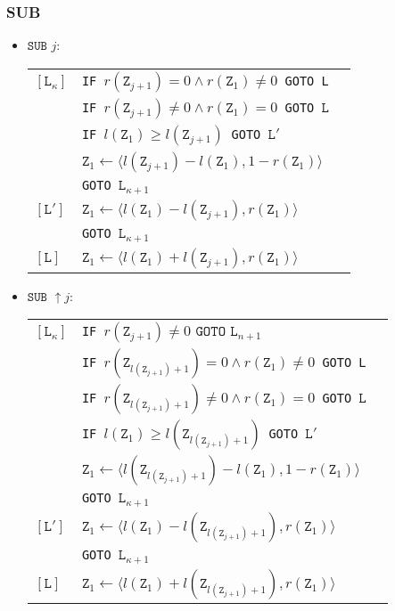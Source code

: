 \documentclass[twoside]{article}
\begin{document}
\subsubsection{SUB}
\begin{itemize}
\item $\texttt{SUB }j$:

\begin{tabular}{l l l}
$[\texttt{L}_\kappa]$&\texttt{IF }$r(\texttt{Z}_{j+1})= 0\land r(\texttt{Z}_{1})\neq 0$\texttt{ GOTO L}&\\
&\texttt{IF }$r(\texttt{Z}_{j+1})\neq 0\land r(\texttt{Z}_1)= 0$\texttt{ GOTO }$\texttt{L}$&\\
&\texttt{IF }$l(\texttt{Z}_1)\geq l(\texttt{Z}_{j+1})$\texttt{ GOTO }$\texttt{L}'$&\\
& $\texttt{Z}_1\leftarrow \langle l(\texttt{Z}_{j+1})-l(\texttt{Z}_1),1-r(\texttt{Z}_{1})\rangle$&\\
& \texttt{GOTO }$\texttt{L}_{\kappa+1}$&\\
$[\texttt{L}']$& $\texttt{Z}_1\leftarrow \langle l(\texttt{Z}_1)-l(\texttt{Z}_{j+1}),r(\texttt{Z}_{1})\rangle$&\\
& \texttt{GOTO }$\texttt{L}_{\kappa+1}$& \\
$[\texttt{L}]$& $\texttt{Z}_1\leftarrow \langle l(\texttt{Z}_{1})+l(\texttt{Z}_{j+1}),r(\texttt{Z}_{1})\rangle$&\\

\end{tabular}

\item $\texttt{SUB }\uparrow j$:

\begin{tabular}{l l l}
$[\texttt{L}_\kappa]$&\texttt{IF }$r(\texttt{Z}_{j+1})\neq 0\texttt{ GOTO }\texttt{L}_{n+1}$&\\

&\texttt{IF }$r(\texttt{Z}_{l(\texttt{Z}_{j+1})+1})= 0\land r(\texttt{Z}_{1})\neq 0$\texttt{ GOTO L}&\\
&\texttt{IF }$r(\texttt{Z}_{l(\texttt{Z}_{j+1})+1})\neq 0\land r(\texttt{Z}_1)= 0$\texttt{ GOTO }$\texttt{L}$&\\
&\texttt{IF }$l(\texttt{Z}_1)\geq l(\texttt{Z}_{l(\texttt{Z}_{j+1})+1})$\texttt{ GOTO }$\texttt{L}'$&\\
& $\texttt{Z}_1\leftarrow \langle l(\texttt{Z}_{l(\texttt{Z}_{j+1})+1})-l(\texttt{Z}_1),1-r(\texttt{Z}_{1})\rangle$&\\
& \texttt{GOTO }$\texttt{L}_{\kappa+1}$&\\
$[\texttt{L}']$& $\texttt{Z}_1\leftarrow \langle l(\texttt{Z}_1)-l(\texttt{Z}_{l(\texttt{Z}_{j+1})+1}),r(\texttt{Z}_{1})\rangle$&\\
& \texttt{GOTO }$\texttt{L}_{\kappa+1}$& \\
$[\texttt{L}]$& $\texttt{Z}_1\leftarrow \langle l(\texttt{Z}_{1})+l(\texttt{Z}_{l(\texttt{Z}_{j+1})+1}),r(\texttt{Z}_{1})\rangle$&\\
\end{tabular}


\end{itemize}
\end{document}
